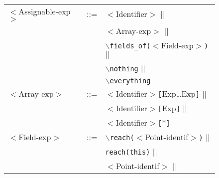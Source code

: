 \documentclass[a4paper]{llncs}
\begin{document}
\begin{figure}[hbt]
\begin{tabular}{lll}
$<$\textsf{Assignable-exp}$>$  &::= &$<$\textsf{Identifier}$>$ $||$ \\
                           &    &$<$\textsf{Array-exp}$>$  $||$ \\
                           &  &$\backslash$\texttt{fields\_of(}$<$\textsf{Field-exp}$>$\texttt{)} $||$ \\
                           &  &$\backslash$\texttt{nothing} $||$\\
                           &  &$\backslash$\texttt{everything} \\
$<$\textsf{Array-exp}$>$      &::=  &$<$\textsf{Identifier}$>$\texttt{[}\textsf{Exp}\ldots \textsf{Exp}\texttt{]} $||$ \\
                           &  &$<$\textsf{Identifier}$>$\texttt{[}\textsf{Exp}\texttt{]} $||$ \\
                           &  &$<$\textsf{Identifier}$>$\texttt{[}*\texttt{]} \\
$<$\textsf{Field-exp}$>$      &::=  &$\backslash$\texttt{reach(}$<$\textsf{Point-identif}$>$\texttt{)} $||$ \\
                           &     &\texttt{reach(}\texttt{this}\texttt{)} $||$ \\
                           &     &$<$\textsf{Point-identif}$>$ $||$ \\

\end{tabular}
\end{figure}
\end{document}
